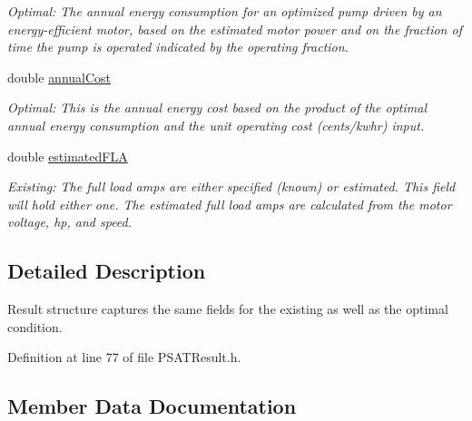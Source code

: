 \begin{DoxyCompactItemize}
\begin{DoxyCompactList}\small\item\em Optimal\+: The annual energy consumption for an optimized pump driven by an energy-\/efficient motor, based on the estimated motor power and on the fraction of time the pump is operated indicated by the operating fraction. \end{DoxyCompactList}\item 
double \hyperlink{struct_p_s_a_t_result_1_1result_aedad1595120e8b1140020f895d8275fe}{annual\+Cost}
\begin{DoxyCompactList}\small\item\em Optimal\+: This is the annual energy cost based on the product of the optimal annual energy consumption and the unit operating cost (cents/kwhr) input. \end{DoxyCompactList}\item 
\mbox{\label{struct_p_s_a_t_result_1_1result_a95949480ff2b7e6d103a955e3b96968c}} 
double \hyperlink{struct_p_s_a_t_result_1_1result_a95949480ff2b7e6d103a955e3b96968c}{estimated\+F\+LA}
\begin{DoxyCompactList}\small\item\em Existing\+: The full load amps are either specified (known) or estimated. This field will hold either one. The estimated full load amps are calculated from the motor voltage, hp, and speed. \end{DoxyCompactList}\end{DoxyCompactItemize}


\subsection{Detailed Description}
Result structure captures the same fields for the existing as well as the optimal condition. 

Definition at line 77 of file P\+S\+A\+T\+Result.\+h.



\subsection{Member Data Documentation}
\mbox{\label{struct_p_s_a_t_result_1_1result_aedad1595120e8b1140020f895d8275fe}} 
